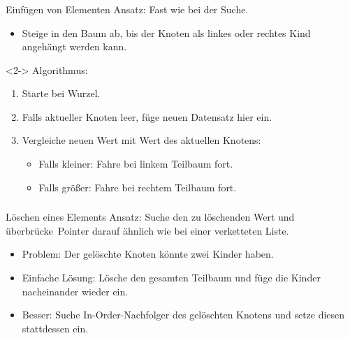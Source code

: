 \begin{frame}
\frametitle{\insertsection}
\begin{block}
{Einfügen von Elementen}
Ansatz: Fast wie bei der Suche.
\begin{itemize}
	\item Steige in den Baum ab, bis der Knoten als linkes oder rechtes Kind angehängt werden kann.
\end{itemize}
\end{block}

\begin{block}<2->
{Algorithmus:}
\begin{enumerate}
	\item Starte bei Wurzel.
	\item Falls \alert{aktueller Knoten leer}, füge neuen Datensatz hier ein.
	\item Vergleiche neuen Wert mit Wert des aktuellen Knotens:
	\begin{itemize}
		\item Falls kleiner: Fahre bei linkem Teilbaum fort.
		\item Falls größer: Fahre bei rechtem Teilbaum fort.
	\end{itemize}
\end{enumerate}
\end{block}
\end{frame}


\begin{frame}
\frametitle{\insertsection}
\begin{block}
{Löschen eines Elements}
Ansatz: Suche den zu löschenden Wert und \glqq überbrücke\grqq\ Pointer darauf ähnlich wie bei einer verketteten Liste.
\begin{itemize}
	\item Problem: Der gelöschte Knoten könnte \alert{zwei} Kinder haben.
	\item<2-> Einfache Lösung: Lösche den gesamten Teilbaum und füge die Kinder nacheinander wieder ein.
	\item<3-> Besser: Suche \alert{In-Order-Nachfolger} des gelöschten Knotens und setze diesen stattdessen ein.
\end{itemize}
\end{block}
\end{frame}


\endinput

\begin{frame}
\frametitle{\insertsection}
\begin{block}
{}
\end{block}
\end{frame}